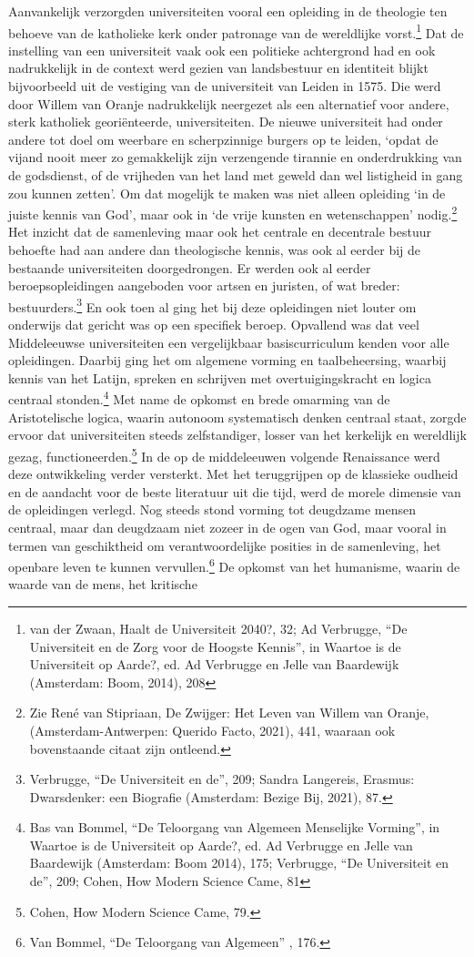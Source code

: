 \documentclass[empirical, authordate, ]{new-jote-article}
\begin{document}
	Aanvankelijk verzorgden universiteiten vooral een opleiding in de theologie ten behoeve van de katholieke kerk onder patronage van de wereldlijke vorst.\footnote{van der Zwaan, Haalt de Universiteit 2040?, 32; Ad Verbrugge, “De Universiteit en de Zorg voor de Hoogste Kennis”, in Waartoe is de Universiteit op Aarde?, ed. Ad Verbrugge en Jelle van Baardewijk (Amsterdam: Boom, 2014), 208} Dat de instelling van een universiteit vaak ook een politieke achtergrond had en ook nadrukkelijk in de context werd gezien van landsbestuur en identiteit blijkt bijvoorbeeld uit de vestiging van de universiteit van Leiden in 1575. Die werd door Willem van Oranje nadrukkelijk neergezet als een alternatief voor andere, sterk katholiek georiënteerde, universiteiten. De nieuwe universiteit had onder andere tot doel om weerbare en scherpzinnige burgers op te leiden, ‘opdat de vijand nooit meer zo gemakkelijk zijn verzengende tirannie en onderdrukking van de godsdienst, of de vrijheden van het land met geweld dan wel listigheid in gang zou kunnen zetten'. Om dat mogelijk te maken was niet alleen opleiding ‘in de juiste kennis van God', maar ook in ‘de vrije kunsten en wetenschappen' nodig.\footnote{Zie René van Stipriaan, De Zwijger: Het Leven van Willem van Oranje, (Amsterdam-Antwerpen: Querido Facto, 2021), 441, waaraan ook bovenstaande citaat zijn ontleend.} Het inzicht dat de samenleving maar ook het centrale en decentrale bestuur behoefte had aan andere dan theologische kennis, was ook al eerder bij de bestaande universiteiten doorgedrongen. Er werden ook al eerder beroepsopleidingen aangeboden voor artsen en juristen, of wat breder: bestuurders.\footnote{Verbrugge, “De Universiteit en de”, 209; Sandra Langereis, Erasmus: Dwarsdenker: een Biografie (Amsterdam: Bezige Bij, 2021), 87.} En ook toen al ging het bij deze opleidingen niet louter om onderwijs dat gericht was op een specifiek beroep. Opvallend was dat veel Middeleeuwse universiteiten een vergelijkbaar basiscurriculum kenden voor alle opleidingen. Daarbij ging het om algemene vorming en taalbeheersing, waarbij kennis van het Latijn, spreken en schrijven met overtuigingskracht en logica centraal stonden.\footnote{Bas van Bommel, “De Teloorgang van Algemeen Menselijke Vorming”, in Waartoe is de Universiteit op Aarde?, ed. Ad Verbrugge en Jelle van Baardewijk (Amsterdam: Boom 2014), 175; Verbrugge, “De Universiteit en de”, 209; Cohen, How Modern Science Came, 81} Met name de opkomst en brede omarming van de Aristotelische logica, waarin autonoom systematisch denken centraal staat, zorgde ervoor dat universiteiten steeds zelfstandiger, losser van het kerkelijk en wereldlijk gezag, functioneerden.\footnote{Cohen, How Modern Science Came, 79.} In de op de middeleeuwen volgende Renaissance werd deze ontwikkeling verder versterkt. Met het teruggrijpen op de klassieke oudheid en de aandacht voor de beste literatuur uit die tijd, werd de morele dimensie van de opleidingen verlegd. Nog steeds stond vorming tot deugdzame mensen centraal, maar dan deugdzaam niet zozeer in de ogen van God, maar vooral in termen van geschiktheid om verantwoordelijke posities in de samenleving, het openbare leven te kunnen vervullen.\footnote{Van Bommel, “De Teloorgang van Algemeen” , 176.} De opkomst van het humanisme, waarin de waarde van de mens, het kritische 
\end{document}
